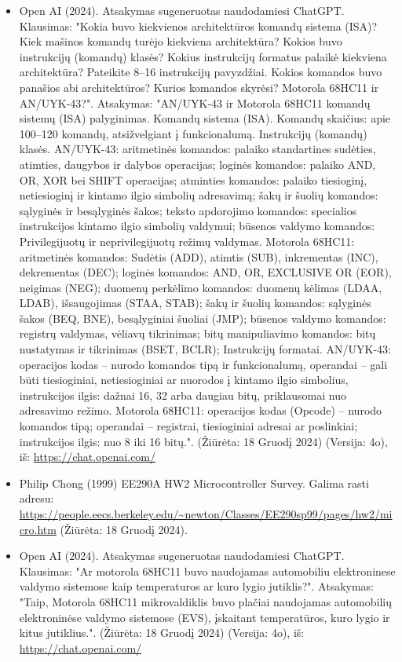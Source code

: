 \documentclass[a4paper,12pt]{article}
\begin{document}
\begin{itemize}
    \item Open AI (2024). Atsakymas sugeneruotas naudodamiesi ChatGPT. Klausimas: "Kokia buvo kiekvienos architektūros komandų sistema (ISA)? Kiek mašinos komandų turėjo kiekviena architektūra? Kokios buvo instrukcijų (komandų) klasės? Kokius instrukcijų formatus palaikė kiekviena architektūra? Pateikite 8–16 instrukcijų pavyzdžiai. Kokios komandos buvo panašios abi architektūros? Kurios komandos skyrėsi? Motorola 68HC11 ir AN/UYK-43?". Atsakymas: "AN/UYK-43 ir Motorola 68HC11 komandų sistemų (ISA) palyginimas. Komandų sistema (ISA). Komandų skaičius: apie 100–120 komandų, atsižvelgiant į funkcionalumą. Instrukcijų (komandų) klasės. AN/UYK-43: aritmetinės komandos: palaiko standartines sudėties, atimties, daugybos ir dalybos operacijas; loginės komandos: palaiko AND, OR, XOR bei SHIFT operacijas; atminties komandos: palaiko tiesioginį, netiesioginį ir kintamo ilgio simbolių adresavimą; šakų ir šuolių komandos: sąlyginės ir besąlyginės šakos; teksto apdorojimo komandos: specialios instrukcijos kintamo ilgio simbolių valdymui; būsenos valdymo komandos: Privilegijuotų ir neprivilegijuotų režimų valdymas. Motorola 68HC11: aritmetinės komandos: Sudėtis (ADD), atimtis (SUB), inkrementas (INC), dekrementas (DEC); loginės komandos: AND, OR, EXCLUSIVE OR (EOR), neigimas (NEG); duomenų perkėlimo komandos: duomenų kėlimas (LDAA, LDAB), išsaugojimas (STAA, STAB); šakų ir šuolių komandos: sąlyginės šakos (BEQ, BNE), besąlyginiai šuoliai (JMP); būsenos valdymo komandos: registrų valdymas, vėliavų tikrinimas; bitų manipuliavimo komandos: bitų nustatymas ir tikrinimas (BSET, BCLR); Instrukcijų formatai. AN/UYK-43: operacijos kodas – nurodo komandos tipą ir funkcionalumą, operandai – gali būti tiesioginiai, netiesioginiai ar nuorodos į kintamo ilgio simbolius, instrukcijos ilgis: dažnai 16, 32 arba daugiau bitų, priklausomai nuo adresavimo režimo. Motorola 68HC11: operacijos kodas (Opcode) – nurodo komandos tipą; operandai – registrai, tiesioginiai adresai ar poslinkiai; instrukcijos ilgis: nuo 8 iki 16 bitų.". (Žiūrėta: 18 Gruodį 2024) (Versija: 4o), iš: \url{https://chat.openai.com/}
    \item Philip Chong (1999) EE290A HW2 Microcontroller Survey. Galima rasti adresu: \url{https://people.eecs.berkeley.edu/~newton/Classes/EE290sp99/pages/hw2/micro.htm} (Žiūrėta: 18 Gruodį 2024).
    \item Open AI (2024). Atsakymas sugeneruotas naudodamiesi ChatGPT. Klausimas: "Ar motorola 68HC11 buvo naudojamas automobiliu elektroninese valdymo sistemose kaip temperaturos ar kuro lygio jutiklis?". Atsakymas: "Taip, Motorola 68HC11 mikrovaldiklis buvo plačiai naudojamas automobilių elektroninėse valdymo sistemose (EVS), įskaitant temperatūros, kuro lygio ir kitus jutiklius.". (Žiūrėta: 18 Gruodį 2024) (Versija: 4o), iš: \url{https://chat.openai.com/}

\end{itemize}
\end{document}

